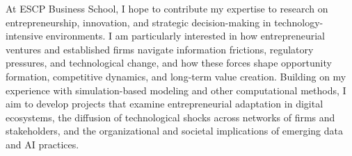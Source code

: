 \documentclass{nfr}
\begin{document}
At ESCP Business School, I hope to contribute my expertise to research on entrepreneurship, innovation, and strategic decision-making in technology-intensive environments. 
I am particularly interested in how entrepreneurial ventures and established firms navigate information frictions, regulatory pressures, and technological change, and how these forces shape opportunity formation, competitive dynamics, and long-term value creation. 
Building on my experience with simulation-based modeling and other computational methods, I aim to develop projects that examine entrepreneurial adaptation in digital ecosystems, the diffusion of technological shocks across networks of firms and stakeholders, and the organizational and societal implications of emerging data and AI practices.\\
\end{document}
